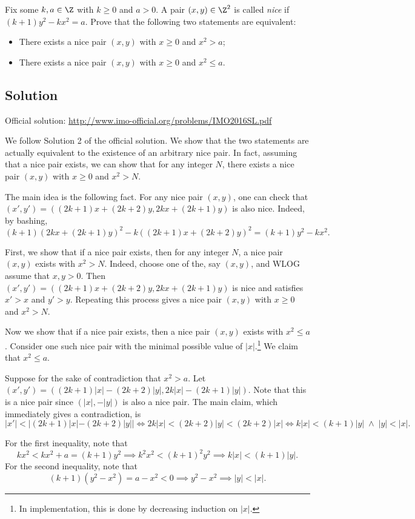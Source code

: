 Fix some $k, a \in \Z$ with $k \geq 0$ and $a > 0$.
A pair $(x, y) \in \Z^2$ is called \emph{nice} if $(k + 1) y^2 - k x^2 = a$.
Prove that the following two statements are equivalent:
\begin{itemize}
    \item   There exists a nice pair $(x, y)$ with $x \geq 0$ and $x^2 > a$;
    \item   There exists a nice pair $(x, y)$ with $x \geq 0$ and $x^2 \leq a$.
\end{itemize}



\subsection*{Solution}

Official solution: \url{http://www.imo-official.org/problems/IMO2016SL.pdf}

We follow Solution 2 of the official solution.
We show that the two statements are actually equivalent to the existence of an arbitrary nice pair.
In fact, assuming that a nice pair exists, we can show that for any integer $N$, there exists a nice pair $(x, y)$ with $x \geq 0$ and $x^2 > N$.

The main idea is the following fact.
For any nice pair $(x, y)$, one can check that $(x', y') = ((2k + 1) x + (2k + 2) y, 2k x + (2k + 1) y)$ is also nice.
Indeed, by bashing,
\[ (k + 1) (2k x + (2k + 1) y)^2 - k ((2k + 1) x + (2k + 2) y)^2 = (k + 1) y^2 - k x^2. \]

First, we show that if a nice pair exists, then for any integer $N$, a nice pair $(x, y)$ exists with $x^2 > N$.
Indeed, choose one of the, say $(x, y)$, and WLOG assume that $x, y > 0$.
Then $(x', y') = ((2k + 1) x + (2k + 2) y, 2k x + (2k + 1) y)$ is nice and satisfies $x' > x$ and $y' > y$.
Repeating this process gives a nice pair $(x, y)$ with $x \geq 0$ and $x^2 > N$.

Now we show that if a nice pair exists, then a nice pair $(x, y)$ exists with $x^2 \leq a$.
Consider one such nice pair with the minimal possible value of $|x|$.\footnote{In implementation, this is done by decreasing induction on $|x|$.}
We claim that $x^2 \leq a$.

Suppose for the sake of contradiction that $x^2 > a$.
Let $(x', y') = ((2k + 1) |x| - (2k + 2) |y|, 2k |x| - (2k + 1) |y|)$.
Note that this is a nice pair since $(|x|, -|y|)$ is also a nice pair.
The main claim, which immediately gives a contradiction, is
\[ |x'| < |(2k + 1) |x| - (2k + 2) |y|| \iff 2k |x| < (2k + 2) |y| < (2k + 2) |x| \iff k|x| < (k + 1) |y| \; \wedge \; |y| < |x|. \]

For the first inequality, note that
\[ kx^2 < kx^2 + a = (k + 1) y^2 \implies k^2 x^2 < (k + 1)^2 y^2 \implies k|x| < (k + 1) |y|. \]
For the second inequality, note that
\[ (k + 1)(y^2 - x^2) = a - x^2 < 0 \implies y^2 - x^2 \implies |y| < |x|. \]
